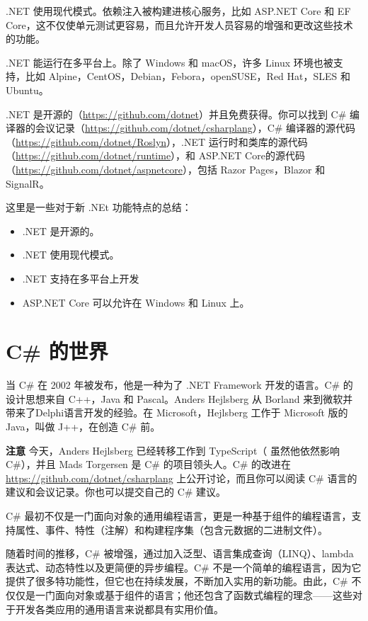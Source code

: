 .NET 使用现代模式。依赖注入被构建进核心服务，比如 ASP.NET Core 和 EF Core，这不仅使单元测试更容易，而且允许开发人员容易的增强和更改这些技术的功能。

.NET 能运行在多平台上。除了 Windows 和 macOS，许多 Linux 环境也被支持，比如 Alpine，CentOS，Debian，Febora，openSUSE，Red Hat，SLES 和 Ubuntu。

.NET 是开源的（\url{https://github.com/dotnet}）并且免费获得。你可以找到 C\# 编译器的会议记录（\url{https://github.com/dotnet/csharplang}），C\# 编译器的源代码（\url{https://github.com/dotnet/Roslyn}），.NET 运行时和类库的源代码（\url{https://github.com/dotnet/runtime}），和 ASP.NET Core的源代码（\url{https://github.com/dotnet/aspnetcore}），包括 Razor Pages，Blazor 和 SignalR。

这里是一些对于新 .NEt 功能特点的总结：
\begin{itemize}
    \item .NET 是开源的。
    \item .NET 使用现代模式。
    \item .NET 支持在多平台上开发
    \item ASP.NET Core 可以允许在 Windows 和 Linux 上。
\end{itemize}

\section*{C\# 的世界}
当 C\# 在 2002 年被发布，他是一种为了 .NET Framework 开发的语言。C\# 的设计思想来自 C++，Java 和 Pascal。Anders Hejlsberg 从 Borland 来到微软并带来了Delphi语言开发的经验。在 Microsoft，Hejlsberg 工作于 Microsoft 版的 Java，叫做 J++，在创造 C\# 前。

\textbf{注意} 今天，Anders Hejlsberg 已经转移工作到 TypeScript（ 虽然他依然影响 C\#），并且 Mads Torgersen 是 C\# 的项目领头人。C\# 的改进在 \url{https://github.com/dotnet/csharplang} 上公开讨论，而且你可以阅读 C\# 语言的建议和会议记录。你也可以提交自己的 C\# 建议。

C\# 最初不仅是一门面向对象的通用编程语言，更是一种基于组件的编程语言，支持属性、事件、特性（注解）和构建程序集（包含元数据的二进制文件）。

随着时间的推移，C\# 被增强，通过加入泛型、语言集成查询（LINQ）、lambda 表达式、动态特性以及更简便的异步编程。C\# 不是一个简单的编程语言，因为它提供了很多特功能性，但它也在持续发展，不断加入实用的新功能。由此，C\# 不仅仅是一门面向对象或基于组件的语言；他还包含了函数式编程的理念——这些对于开发各类应用的通用语言来说都具有实用价值。

